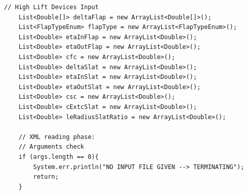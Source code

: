 \bigskip
\begin{lstlisting}[caption={Excerpt of B747-100B test - Input data reading}, captionpos=b, tabsize=2]
	// High Lift Devices Input
	List<Double[]> deltaFlap = new ArrayList<Double[]>();
	List<FlapTypeEnum> flapType = new ArrayList<FlapTypeEnum>();
	List<Double> etaInFlap = new ArrayList<Double>();
	List<Double> etaOutFlap = new ArrayList<Double>();
	List<Double> cfc = new ArrayList<Double>();
	List<Double> deltaSlat = new ArrayList<Double>();
	List<Double> etaInSlat = new ArrayList<Double>();
	List<Double> etaOutSlat = new ArrayList<Double>();
	List<Double> csc = new ArrayList<Double>();
	List<Double> cExtcSlat = new ArrayList<Double>();
	List<Double> leRadiusSlatRatio = new ArrayList<Double>();
		
	// XML reading phase:
	// Arguments check
	if (args.length == 0){
		System.err.println("NO INPUT FILE GIVEN --> TERMINATING");
		return;
	}
		

\end{lstlisting}
